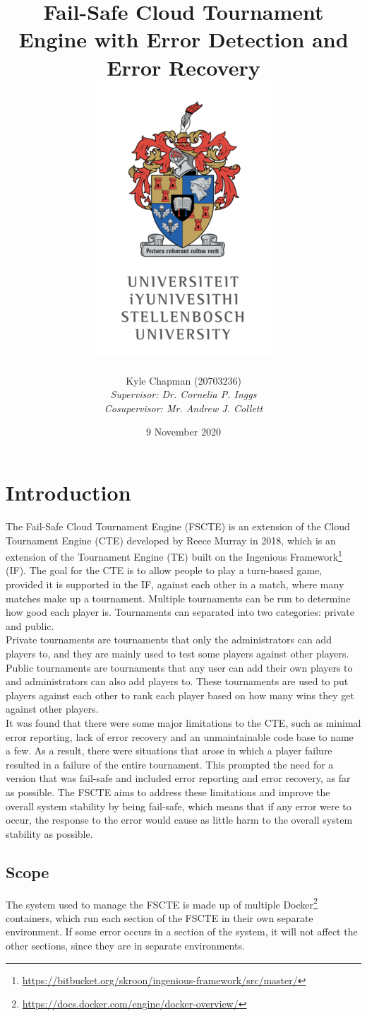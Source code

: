 \documentclass[a4paper, 12pt]{report}
\title{
	{Fail-Safe Cloud Tournament Engine with Error Detection and Error Recovery} \\
	{\includegraphics[scale=1.4]{logo.png}}
}
\author{
	{Kyle Chapman (20703236)} \\
	{\emph{Supervisor: Dr. Cornelia P. Inggs}} \\
	{\emph{Cosupervisor: Mr. Andrew J. Collett}}
}
\date{9 November 2020}
\begin{document}
\maketitle
\tableofcontents

\chapter{Introduction}

The Fail-Safe Cloud Tournament Engine (FSCTE) is an extension of the Cloud
Tournament Engine (CTE) developed by Reece Murray in 2018, which is an extension
of the Tournament Engine (TE) built on the Ingenious Framework\footnote{\url{https://bitbucket.org/skroon/ingenious-framework/src/master/}}
(IF). The goal for the CTE is to allow people to play a turn-based game, provided
it is supported in the IF, against each other in a match, where many matches
make up a tournament. Multiple tournaments can be run to determine how good
each player is. Tournaments can separated into two categories: private and public. \\

Private tournaments are tournaments that only the administrators can add players
to, and they are mainly used to test some players against other players. Public
tournaments are tournaments that any user can add their own players to and
administrators can also add players to. These tournaments are used to put players
against each other to rank each player based on how many wins they get against
other players. \\

It was found that there were some major limitations to the CTE, such as minimal
error reporting, lack of error recovery and an unmaintainable code base to name
a few. As a result, there were situations that arose in which a player failure
resulted in a failure of the entire tournament. This prompted the need for a
version that was fail-safe and included error reporting and error recovery, as
far as possible. The FSCTE aims to address these limitations and improve the
overall system stability by being fail-safe, which means that if any error were
to occur, the response to the error would cause as little harm to the overall
system stability as possible.

\section{Scope}

The system used to manage the FSCTE is made up of multiple Docker\footnote{\url{https://docs.docker.com/engine/docker-overview/}}
containers, which run each section of the FSCTE in their own separate environment.
If some error occurs in a section of the system, it will not affect the other
sections, since they are in separate environments. \\
\end{document}
